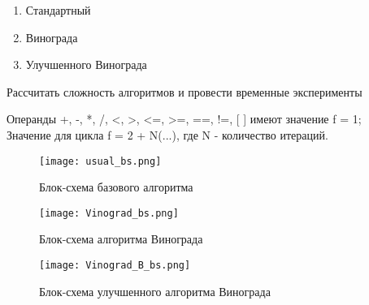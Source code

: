 	\newpage	
	
	
	\begin{enumerate}
		\item Стандартный
		\item Винограда
		\item Улучшенного Винограда
	\end{enumerate}
	Рассчитать сложность алгоритмов и провести временные эксперименты
	
	\flushleft
	Операнды +, -, *, /, <, >, <=, >=, ==, !=, [ ] имеют значение f = 1;\\
	Значение для цикла f = 2 + N(...), где N - количество итераций.
	
	

	
	\newpage
	\begin{figure}[h!]
		\texttt{[image: usual\_bs.png]}
		\caption{Блок-схема базового алгоритма}
	\end{figure}
	
	\newpage
	\begin{figure}[h!]
		\texttt{[image: Vinograd\_bs.png]}
		\caption{Блок-схема алгоритма Винограда}
	\end{figure}

	\newpage
	\begin{figure}[h!]
	\texttt{[image: Vinograd\_B\_bs.png]}
	\caption{Блок-схема улучшенного алгоритма Винограда}
	\end{figure}




	\newpage
	
